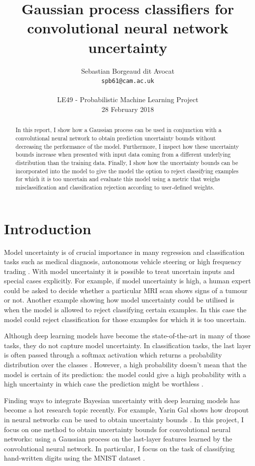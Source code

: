 \documentclass{article}
\title{Gaussian process classifiers for convolutional neural network uncertainty}
\author{
  Sebastian Borgeaud dit Avocat \\
  \texttt{spb61@cam.ac.uk} \\ \\
  LE49 - Probabilistic Machine Learning Project \\
  \small{28 February 2018}
}
\begin{document}

\maketitle

\begin{abstract}
  In this report, I show how a Gaussian process can be used in conjunction with a convolutional neural network to obtain prediction uncertainty bounds without decreasing the performance of the model. Furthermore, I inspect how these uncertainty bounds increase when presented with input data coming from a different underlying distribution than the training data. Finally, I show how the uncertainty bounds can be incorporated into the model to give the model the option to reject classifying examples for which it is too uncertain and evaluate this model using a metric that weighs misclassification and classification rejection according to user-defined weights.
\end{abstract}

\section{Introduction}
Model uncertainty is of crucial importance in many regression and classification tasks such as medical diagnosis, autonomous vehicle steering or high frequency trading \cite{Gal2016Uncertainty}. With model uncertainty it is possible to treat uncertain inputs and special cases explicitly. For example, if model uncertainty is high, a human expert could be asked to decide whether a particular MRI scan shows signs of a tumour or not. Another example showing how model uncertainty could be utilised is when the model is allowed to reject classifying certain examples. In this case the model could reject classification for those examples for which it is too uncertain.

Although deep learning models have become the state-of-the-art in many of those tasks, they do not capture model uncertainty. In classification tasks, the last layer is often passed through a softmax activation which returns a probability distribution over the classes \cite{Goodfellow-et-al-2016}. However, a high probability doesn't mean that the model is certain of its prediction: the model could give a high probability with a high uncertainty in which case the prediction might be worthless \cite{gal2016dropout}.

Finding ways to integrate Bayesian uncertainty with deep learning models has become a hot research topic recently. For example, Yarin Gal shows how dropout in neural networks can be used to obtain uncertainty bounds \cite{gal2016dropout}. In this project, I focus on one method to obtain uncertainty bounds for convolutional neural networks: using a Gaussian process on the last-layer features learned by the convolutional neural network. In particular, I focus on the task of classifying hand-written digits using the MNIST dataset \cite{lecun1998gradient}.
\end{document}
